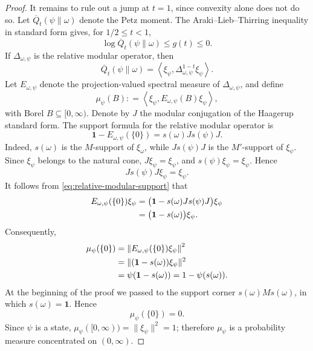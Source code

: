 \documentclass[12pt]{article}
\numberwithin{equation}{section}
\theoremstyle{definition}
\theoremstyle{remark}
\newcommand{\one}{\mathbf 1}
\newcommand{\?}{\overset{?}{=}}
\newcommand{\defeq}{\mathrel{\mathop:}=}
\begin{document}
\begin{proof}
It remains to rule out a jump at $t=1$, since convexity alone does not do so.
Let $\overline Q_t(\psi\|\omega)$ denote the Petz moment.  The
Araki--Lieb--Thirring inequality in standard form
\cite[Theorem~12]{Berta:2016vnw} gives, for
$1/2\leq t<1$,
\begin{equation}
  \log\overline Q_t(\psi\|\omega)
  \leq g(t)\leq0.
  \label{eq:petz-sandwiched-endpoint-squeeze}
\end{equation}
If $\Delta_{\omega,\psi}$ is the relative modular operator, then
\begin{equation}
  \overline Q_t(\psi\|\omega)
  =\left\langle\xi_\psi,
  \Delta_{\omega,\psi}^{1-t}\xi_\psi\right\rangle.
  \label{eq:petz-standard-form-moment}
\end{equation}
Let $E_{\omega,\psi}$ denote the projection-valued spectral measure of
$\Delta_{\omega,\psi}$, and define
\[
  \mu_\psi(B)
  \defeq
  \left\langle\xi_\psi,
  E_{\omega,\psi}(B)\xi_\psi\right\rangle,
\]
with Borel $B\subseteq[0,\infty)$.
Denote by $J$ the modular conjugation of the Haagerup standard form.  The
support formula for the relative modular operator
\cite[Theorem~2.4(1)]{Araki:1977zsq} is
\begin{equation}
  \one-E_{\omega,\psi}(\{0\})
  =
  s(\omega)J s(\psi)J.
  \label{eq:relative-modular-support}
\end{equation}
Indeed, $s(\omega)$ is the $M$-support of $\xi_\omega$, while
$Js(\psi)J$ is the $M'$-support of $\xi_\psi$.  Since
$\xi_\psi$ belongs to the natural cone, $J\xi_\psi=\xi_\psi$, and
$s(\psi)\xi_\psi=\xi_\psi$.  Hence
\[
  Js(\psi)J\xi_\psi=\xi_\psi.
\]
It follows from \eqref{eq:relative-modular-support} that
\begin{align}
  E_{\omega,\psi}(\{0\})\xi_\psi
  &=
  \bigl(\one-s(\omega)Js(\psi)J\bigr)\xi_\psi \notag\\
  &=
  \bigl(\one-s(\omega)\bigr)\xi_\psi.
  \label{eq:relative-modular-kernel-vector}
\end{align}
Consequently,
\begin{align}
  \mu_\psi(\{0\})
  &=
  \left\|E_{\omega,\psi}(\{0\})\xi_\psi\right\|^2 \notag\\
  &=
  \|(\one-s(\omega))\xi_\psi\|^2 \notag\\
  &=
  \psi(\one-s(\omega))
   =1-\psi(s(\omega)).
  \label{eq:relative-modular-zero-mass}
\end{align}
At the beginning of the proof we passed to the support corner
$s(\omega)Ms(\omega)$, in which $s(\omega)=\one$.  Hence
\[
  \mu_\psi(\{0\})=0.
\]
Since $\psi$ is a state, $\mu_\psi([0,\infty))=\|\xi_\psi\|^2=1$;
therefore $\mu_\psi$ is a probability measure concentrated on
$(0,\infty)$.


\end{proof}
\end{document}
